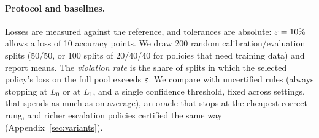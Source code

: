 \paragraph{Protocol and baselines.} Losses are measured against the reference, and tolerances are
absolute: $\varepsilon = 10\%$ allows a loss of 10 accuracy points. We draw 200 random calibration/evaluation
splits (50/50, or 100 splits of 20/40/40 for policies that need training data) and report means. The \emph{violation
rate} is the share of splits in which the selected policy's loss on the full pool exceeds $\varepsilon$. We
compare with uncertified rules (always stopping at $L_0$ or at $L_1$, and a single confidence threshold,
fixed across settings, that spends as much as \climb{} on average), an oracle that stops at the cheapest correct rung, and richer escalation
policies certified the same way (Appendix~\ref{sec:variants}).
